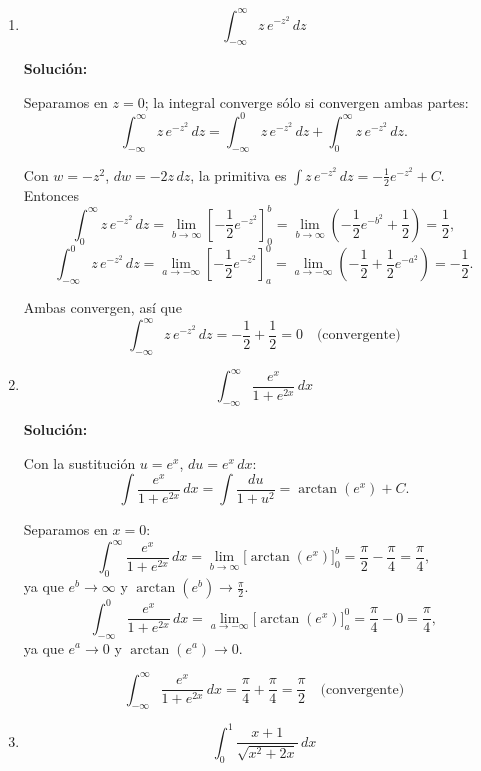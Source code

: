 \documentclass[12pt]{article}
\newcommand{\solucion}{%
    \vspace{0.8em}%
    \textbf{Solución:}%
}
\begin{document}
\begin{enumerate}[label=\alph*.-]
    Cuando $a\to-\infty$: $e^{2a}\to0$ y, por L'Hôpital,
    \[
    \lim_{a\to-\infty}a\,e^{2a}=\lim_{a\to-\infty}\frac{a}{e^{-2a}}
    =\lim_{a\to-\infty}\frac{1}{-2e^{-2a}}=0.
    \]

    \[
    \boxed{
    \int_{-\infty}^{0}t\,e^{2t}\,dt=-\frac14
    \quad\text{(convergente)}
    }
    \]


    \item
    \[
    \int_{-\infty}^{\infty}z\,e^{-z^2}\,dz
    \]

    \solucion

    Separamos en $z=0$; la integral converge sólo si convergen ambas
    partes:
    \[
    \int_{-\infty}^{\infty}z\,e^{-z^2}\,dz
    =\int_{-\infty}^{0}z\,e^{-z^2}\,dz+\int_{0}^{\infty}z\,e^{-z^2}\,dz.
    \]

    Con $w=-z^2$, $dw=-2z\,dz$, la primitiva es
    $\displaystyle\int z\,e^{-z^2}\,dz=-\frac12e^{-z^2}+C$. Entonces
    \[
    \int_{0}^{\infty}z\,e^{-z^2}\,dz
    =\lim_{b\to\infty}\left[-\frac12e^{-z^2}\right]_{0}^{b}
    =\lim_{b\to\infty}\left(-\frac12e^{-b^2}+\frac12\right)=\frac12,
    \]
    \[
    \int_{-\infty}^{0}z\,e^{-z^2}\,dz
    =\lim_{a\to-\infty}\left[-\frac12e^{-z^2}\right]_{a}^{0}
    =\lim_{a\to-\infty}\left(-\frac12+\frac12e^{-a^2}\right)=-\frac12.
    \]

    Ambas convergen, así que
    \[
    \boxed{
    \int_{-\infty}^{\infty}z\,e^{-z^2}\,dz=-\frac12+\frac12=0
    \quad\text{(convergente)}
    }
    \]


    \item
    \[
    \int_{-\infty}^{\infty}\frac{e^x}{1+e^{2x}}\,dx
    \]

    \solucion

    Con la sustitución $u=e^x$, $du=e^x\,dx$:
    \[
    \int\frac{e^x}{1+e^{2x}}\,dx=\int\frac{du}{1+u^2}=\arctan(e^x)+C.
    \]

    Separamos en $x=0$:
    \[
    \int_{0}^{\infty}\frac{e^x}{1+e^{2x}}\,dx
    =\lim_{b\to\infty}\Big[\arctan(e^x)\Big]_{0}^{b}
    =\frac\pi2-\frac\pi4=\frac\pi4,
    \]
    ya que $e^b\to\infty$ y $\arctan(e^b)\to\frac\pi2$.
    \[
    \int_{-\infty}^{0}\frac{e^x}{1+e^{2x}}\,dx
    =\lim_{a\to-\infty}\Big[\arctan(e^x)\Big]_{a}^{0}
    =\frac\pi4-0=\frac\pi4,
    \]
    ya que $e^a\to0$ y $\arctan(e^a)\to0$.

    \[
    \boxed{
    \int_{-\infty}^{\infty}\frac{e^x}{1+e^{2x}}\,dx=\frac\pi4+\frac\pi4=\frac\pi2
    \quad\text{(convergente)}
    }
    \]


    \item
    \[
    \int_{0}^{1}\frac{x+1}{\sqrt{x^2+2x}}\,dx
    \]


\end{enumerate}
\end{document}
